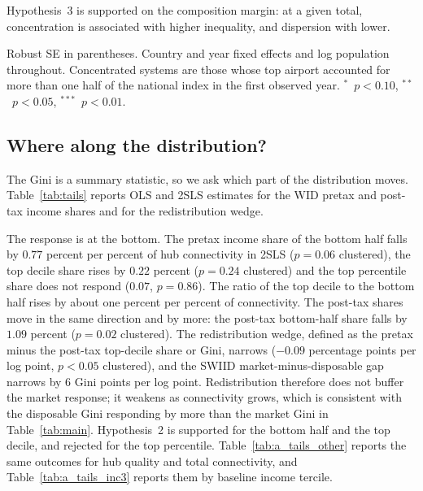 \documentclass[12pt]{article}
\newcommand{\sym}[1]{\ensuremath{^{#1}}}
\begin{document}
Hypothesis~3 is supported on the composition margin: at a given total, concentration is associated with higher inequality, and dispersion with lower.

\begin{table}[H]\centering\caption{Network concentration and inequality.}\label{tab:conc}
\begin{threeparttable}\small
\begin{tablenotes}\footnotesize\item Robust SE in parentheses. Country and year fixed effects and log population throughout. Concentrated systems are those whose top airport accounted for more than one half of the national index in the first observed year. \sym{*}~$p<0.10$, \sym{**}~$p<0.05$, \sym{***}~$p<0.01$.\end{tablenotes}\end{threeparttable}\end{table}

\subsection{Where along the distribution?}
\label{sec:tails}
The Gini is a summary statistic, so we ask which part of the distribution moves. Table~\ref{tab:tails} reports OLS and 2SLS estimates for the WID pretax and post-tax income shares and for the redistribution wedge.

The response is at the bottom. The pretax income share of the bottom half falls by $0.77$ percent per percent of hub connectivity in 2SLS ($p=0.06$ clustered), the top decile share rises by $0.22$ percent ($p=0.24$ clustered) and the top percentile share does not respond ($0.07$, $p=0.86$). The ratio of the top decile to the bottom half rises by about one percent per percent of connectivity. The post-tax shares move in the same direction and by more: the post-tax bottom-half share falls by $1.09$ percent ($p=0.02$ clustered). The redistribution wedge, defined as the pretax minus the post-tax top-decile share or Gini, narrows ($-0.09$ percentage points per log point, $p<0.05$ clustered), and the SWIID market-minus-disposable gap narrows by $6$ Gini points per log point. Redistribution therefore does not buffer the market response; it weakens as connectivity grows, which is consistent with the disposable Gini responding by more than the market Gini in Table~\ref{tab:main}. Hypothesis~2 is supported for the bottom half and the top decile, and rejected for the top percentile. Table~\ref{tab:a_tails_other} reports the same outcomes for hub quality and total connectivity, and Table~\ref{tab:a_tails_inc3} reports them by baseline income tercile.
\end{document}
